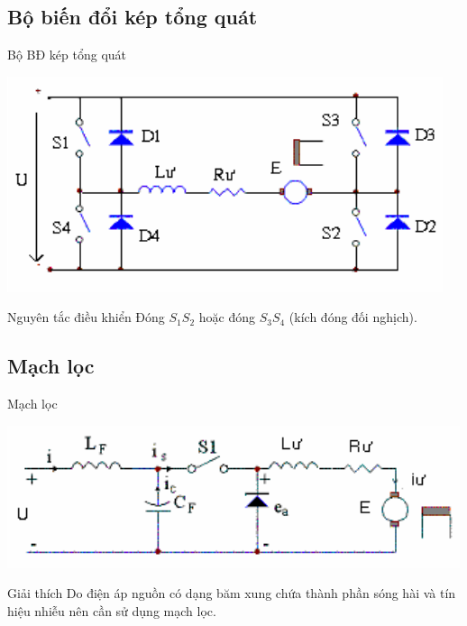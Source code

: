 \documentclass[24pt]{beamer}
\begin{document}
\subsection*{Bộ biến đổi kép tổng quát}
\begin{frame}{Bộ BĐ kép tổng quát}
	\vspace{-.4cm}
	\begin{center}
		\includegraphics[scale=.65]{images-chude5/bo-bien-doi-tong-quat.png} 
	\end{center}
\end{frame}

\begin{frame}{Nguyên tắc điều khiển}
\justifying
Đóng $S_1S_2$ hoặc đóng $S_3S_4$ (\alert{kích đóng đối nghịch}).
\end{frame}

\subsection*{Mạch lọc}
\begin{frame}{Mạch lọc}
	\vspace{-.4cm}
	\begin{center}
		\includegraphics[scale=.65]{images-chude5/mach-loc.png} 
	\end{center}
\end{frame}

\begin{frame}{Giải thích}
\justifying
Do điện áp nguồn có dạng \alert{băm xung} chứa thành phần \alert{sóng hài} và \alert{tín hiệu nhiễu} nên cần sử dụng \alert{mạch lọc}.
\end{frame}
\end{document}
